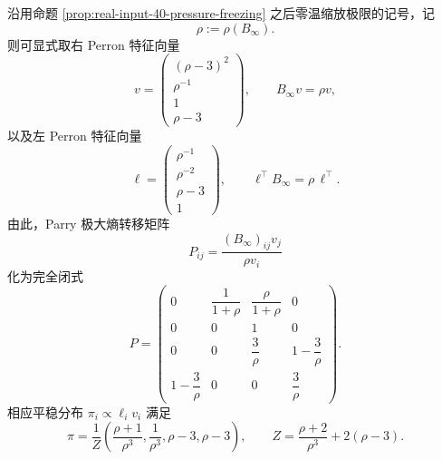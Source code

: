 \begin{theorem}\label{thm:killo-real-input-40-zero-temp-ground-sft-parry-closed-form}
沿用命题 \ref{prop:real-input-40-pressure-freezing} 之后零温缩放极限的记号，记
\[
\rho:=\rho(B_\infty).
\]
则可显式取右 Perron 特征向量
\[
v=
\begin{pmatrix}
(\rho-3)^2\\[1mm]
\rho^{-1}\\[1mm]
1\\[1mm]
\rho-3
\end{pmatrix},
\qquad
B_\infty v=\rho v,
\]
以及左 Perron 特征向量
\[
\ell=
\begin{pmatrix}
\rho^{-1}\\[1mm]
\rho^{-2}\\[1mm]
\rho-3\\[1mm]
1
\end{pmatrix},
\qquad
\ell^{\top}B_\infty=\rho\,\ell^{\top}.
\]
由此，Parry 极大熵转移矩阵
\[
P_{ij}=\frac{(B_\infty)_{ij}v_j}{\rho v_i}
\]
化为完全闭式
\[
P=
\begin{pmatrix}
0 & \dfrac{1}{1+\rho} & \dfrac{\rho}{1+\rho} & 0\\[3mm]
0 & 0 & 1 & 0\\[3mm]
0 & 0 & \dfrac{3}{\rho} & 1-\dfrac{3}{\rho}\\[3mm]
1-\dfrac{3}{\rho} & 0 & 0 & \dfrac{3}{\rho}
\end{pmatrix}.
\]
相应平稳分布 \(\pi_i\propto \ell_i v_i\) 满足
\[
\pi
=
\frac{1}{Z}
\left(
\frac{\rho+1}{\rho^3},
\frac{1}{\rho^3},
\rho-3,
\rho-3
\right),
\qquad
Z=\frac{\rho+2}{\rho^3}+2(\rho-3).
\]
\end{theorem}
